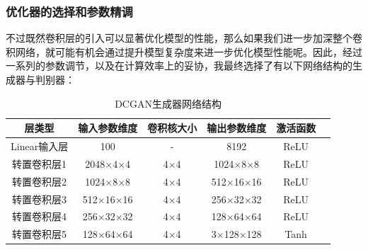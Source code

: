 \documentclass[UTF8]{ctexart}
\begin{document}
\subsubsection{优化器的选择和参数精调}
不过既然卷积层的引入可以显著优化模型的性能，那么如果我们进一步加深整个卷积网络，就可能有机会通过提升模型复杂度来进一步优化模型性能呢。因此，经过一系列的参数调节，以及在计算效率上的妥协，我最终选择了有以下网络结构的生成器与判别器：
\begin{table}[htbp]
    \centering
    \caption{DCGAN生成器网络结构}
    \label{tab:gen_dcgan}
    \begin{tabular}{cccccc}
    \toprule[1.5pt]
    \textbf{层类型} & \textbf{输入参数维度} & \textbf{卷积核大小} & \textbf{输出参数维度} & \textbf{激活函数} \\
    \midrule[1.5pt]
    Linear输入层 & 100 & - & 8192 & ReLU \\
    转置卷积层1 & 2048$\times$4$\times$4 & 4$\times$4 & 1024$\times$8$\times$8 & ReLU \\
    转置卷积层2 & 1024$\times$8$\times$8 & 4$\times$4 & 512$\times$16$\times$16 & ReLU \\
    转置卷积层3 & 512$\times$16$\times$16 & 4$\times$4 & 256$\times$32$\times$32 & ReLU \\
    转置卷积层4 & 256$\times$32$\times$32 & 4$\times$4 & 128$\times$64$\times$64 & ReLU \\
    转置卷积层5 & 128$\times$64$\times$64 & 4$\times$4 & 3$\times$128$\times$128 & Tanh \\
    \bottomrule[1.0pt]
    \end{tabular}
\end{table}
\end{document}
